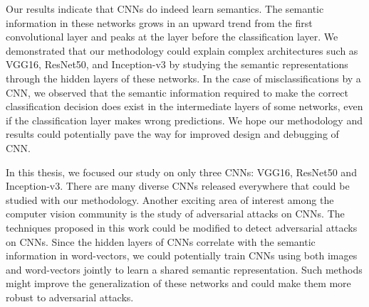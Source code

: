 Our results indicate that CNNs do indeed learn semantics. The semantic information in these networks grows in an upward trend from the first convolutional layer and peaks at the layer before the classification layer. We demonstrated that our methodology could explain complex architectures such as VGG16, ResNet50, and Inception-v3 by studying the semantic representations through the hidden layers of these networks. In the case of misclassifications by a CNN,  we observed that the semantic information required to make the correct classification decision does exist in the intermediate layers of some networks, even if the classification layer makes wrong predictions. We hope our methodology and results could potentially pave the way for improved design and debugging of CNN.

In this thesis, we focused our study on only three CNNs: VGG16, ResNet50 and Inception-v3. There are many diverse CNNs released everywhere that could be studied with our methodology. Another exciting area of interest among the computer vision community is the study of adversarial attacks on CNNs. The techniques proposed in this work could be modified to detect adversarial attacks on CNNs. Since the hidden layers of CNNs correlate with the semantic information in word-vectors, we could potentially train CNNs using both images and word-vectors jointly to learn a shared semantic representation. Such methods might improve the generalization of these networks and could make them more robust to adversarial attacks. 
